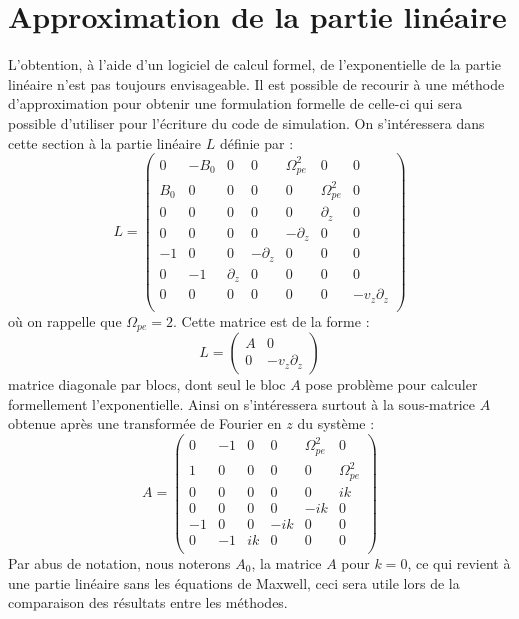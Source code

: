 
\section{Approximation de la partie linéaire}
\label{s3:approx}

L'obtention, à l'aide d'un logiciel de calcul formel, de l'exponentielle de la partie linéaire n'est pas toujours envisageable. Il est possible de recourir à une méthode d'approximation pour obtenir une formulation formelle de celle-ci qui sera possible d'utiliser pour l'écriture du code de simulation. On s'intéressera dans cette section à la partie linéaire $L$ définie par :
$$
  L = \begin{pmatrix}
    0   & -B_0 & 0          &  0          &  \Omega_{pe}^2 & 0             & 0 \\
    B_0 &  0   & 0          &  0          &  0             & \Omega_{pe}^2 & 0 \\
    0   &  0   & 0          &  0          &  0             & \partial_z    & 0 \\
    0   &  0   & 0          &  0          & -\partial_z    & 0             & 0 \\
   -1   &  0   & 0          & -\partial_z &  0             & 0             & 0 \\
    0   & -1   & \partial_z &  0          &  0             & 0             & 0 \\
    0   &  0   & 0          &  0          &  0             & 0             & -v_z\partial_z \\
  \end{pmatrix}
$$
où on rappelle que $\Omega_{pe}=2$. Cette matrice est de la forme :
$$
  L = \begin{pmatrix}
    A & 0 \\
    0 & -v_z\partial_z
  \end{pmatrix}
$$
matrice diagonale par blocs, dont seul le bloc $A$ pose problème pour calculer formellement l'exponentielle. Ainsi on s'intéressera surtout à la sous-matrice $A$ obtenue après une transformée de Fourier en $z$ du système :
$$
  A = \begin{pmatrix}
    0 & -1 & 0  &  0  &  \Omega_{pe}^2  & 0             \\
    1 &  0 & 0  &  0  &  0              & \Omega_{pe}^2 \\
    0 &  0 & 0  &  0  &  0              & ik            \\
    0 &  0 & 0  &  0  & -ik             & 0             \\
   -1 &  0 & 0  & -ik &  0              & 0             \\
    0 & -1 & ik &  0  &  0              & 0             \\
  \end{pmatrix}
$$
Par abus de notation, nous noterons $A_0$, la matrice $A$ pour $k=0$, ce qui revient à une partie linéaire sans les équations de Maxwell, ceci sera utile lors de la comparaison des résultats entre les méthodes.

